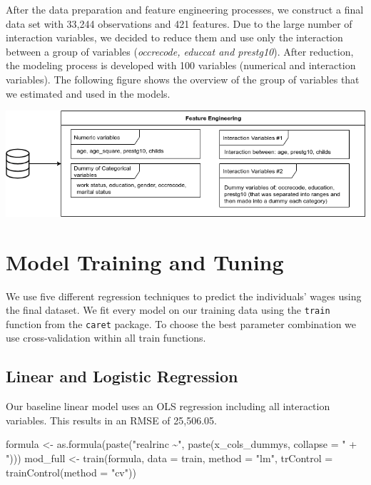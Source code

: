 \documentclass[11pt,a4paper]{article}
\let\origfigure\figure
\let\endorigfigure\endfigure
\renewenvironment{figure}[1][2] {
    \expandafter\origfigure\expandafter[H]
} {
    \endorigfigure
}
\newenvironment{Shaded}{\begin{snugshade}}{\end{snugshade}}
\newcommand{\AttributeTok}[1]{\textcolor[rgb]{0.77,0.63,0.00}{#1}}
\newcommand{\FunctionTok}[1]{\textcolor[rgb]{0.00,0.00,0.00}{#1}}
\newcommand{\NormalTok}[1]{#1}
\newcommand{\OtherTok}[1]{\textcolor[rgb]{0.56,0.35,0.01}{#1}}
\newcommand{\StringTok}[1]{\textcolor[rgb]{0.31,0.60,0.02}{#1}}
\begin{document}
After the data preparation and feature engineering processes, we
construct a final data set with 33,244 observations and 421 features.
Due to the large number of interaction variables, we decided to reduce
them and use only the interaction between a group of variables
(\emph{occrecode, educcat and prestg10}). After reduction, the modeling
process is developed with 100 variables (numerical and interaction
variables). The following figure shows the overview of the group of
variables that we estimated and used in the models.

\begin{figure}
\centering
\includegraphics{includes/feature_process.png}
\caption{feature\_process}
\end{figure}

\hypertarget{model-training-and-tuning}{%
\section{Model Training and Tuning}\label{model-training-and-tuning}}

We use five different regression techniques to predict the individuals'
wages using the final dataset. We fit every model on our training data
using the \texttt{train} function from the \texttt{caret} package. To
choose the best parameter combination we use cross-validation within all
train functions.

\hypertarget{linear-and-logistic-regression}{%
\subsection{Linear and Logistic
Regression}\label{linear-and-logistic-regression}}

Our baseline linear model uses an OLS regression including all
interaction variables. This results in an RMSE of 25,506.05.

\begin{Shaded}
\begin{Highlighting}[]
\NormalTok{formula }\OtherTok{\textless{}{-}} \FunctionTok{as.formula}\NormalTok{(}\FunctionTok{paste}\NormalTok{(}\StringTok{"realrinc \textasciitilde{}"}\NormalTok{, }\FunctionTok{paste}\NormalTok{(x\_cols\_dummys, }\AttributeTok{collapse =} \StringTok{" + "}\NormalTok{)))}
\NormalTok{mod\_full }\OtherTok{\textless{}{-}} \FunctionTok{train}\NormalTok{(formula,}
                  \AttributeTok{data =}\NormalTok{ train, }
                  \AttributeTok{method =} \StringTok{"lm"}\NormalTok{,  }
                  \AttributeTok{trControl =} \FunctionTok{trainControl}\NormalTok{(}\AttributeTok{method =} \StringTok{"cv"}\NormalTok{))}
\end{Highlighting}
\end{Shaded}
\end{document}
